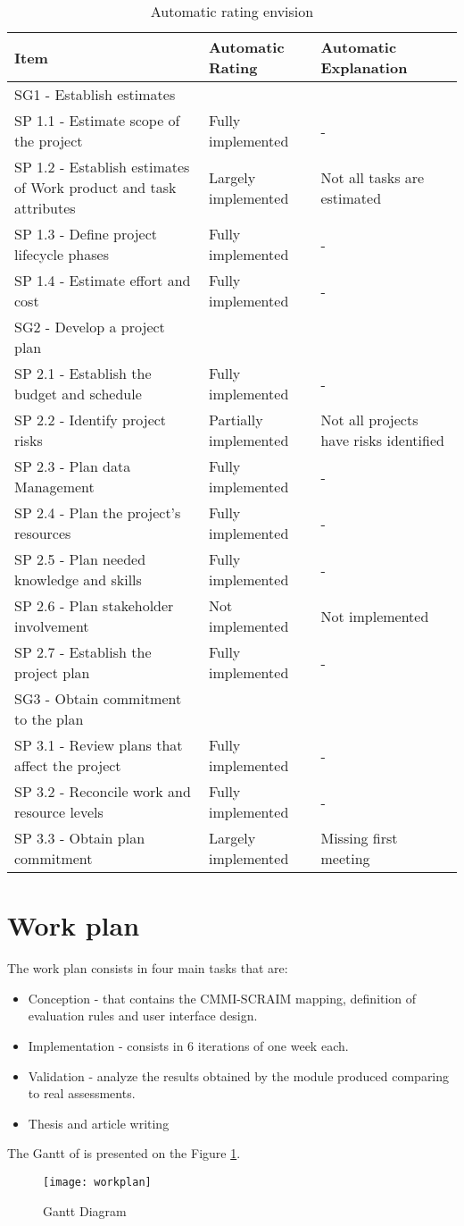 \begin{table}[h]
	\centering
	\caption{Automatic rating envision}
	\begin{tabular}{|p{6cm}|p{3cm}|p{3cm}|}
		\hline
		Item & Automatic Rating & Automatic Explanation\\
		\hline
		SG1 - Establish estimates&&\\
		SP 1.1 - Estimate scope of the project & Fully implemented & - \\
		SP 1.2 - Establish estimates of Work product and task attributes & Largely implemented & Not all tasks are estimated \\
		SP 1.3 - Define project lifecycle phases & Fully implemented & - \\
		SP 1.4 - Estimate effort and cost & Fully implemented & - \\
		\hline
		SG2 - Develop a project plan&&\\
		SP 2.1 - Establish the budget and schedule & Fully implemented & - \\
		SP 2.2 - Identify project risks & Partially implemented & Not all projects have risks identified \\
		SP 2.3 - Plan data Management & Fully implemented & - \\
		SP 2.4 - Plan the project's resources & Fully implemented & - \\
		SP 2.5 - Plan needed knowledge and skills & Fully implemented & - \\
		SP 2.6 - Plan stakeholder involvement & Not implemented & Not implemented \\
		SP 2.7 - Establish the project plan & Fully implemented & - \\
		\hline
		SG3 - Obtain commitment to the plan&&\\
		SP 3.1 - Review plans that affect the project & Fully implemented & - \\
		SP 3.2 - Reconcile work and resource levels & Fully implemented & - \\
		SP 3.3 - Obtain plan commitment & Largely implemented & Missing first meeting  \\
		\hline
	\end{tabular}
	\label{tab:envision}
\end{table}
\section{Work plan}

The work plan consists in four main tasks that are:
\begin{itemize}
	\item Conception - that contains the CMMI-SCRAIM mapping, definition of evaluation rules and user interface design.
	\item Implementation - consists in 6 iterations of one week each.
	\item Validation - analyze the results obtained by the module produced comparing to real assessments.
	\item Thesis and article writing
\end{itemize}

The Gantt of is presented on the Figure \ref{fig:workplan}.

\begin{figure}[h]
	\begin{center}
		\leavevmode
		\texttt{[image: workplan]}
		\caption{Gantt Diagram}
		\label{fig:workplan}
	\end{center}
\end{figure}